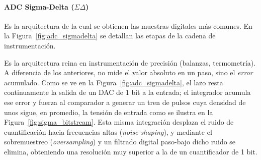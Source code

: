 \paragraph{ADC Sigma-Delta ($\Sigma\Delta$)}
Es la arquitectura de la cual se obtienen las muestras digitales más comunes. En la Figura~\ref{fig:adc_sigmadelta} se detallan las etapas de la cadena de instrumentación.
\begin{marginfigure}
    \centering
    \shorthandoff{>}
    \caption[Modulador Sigma-Delta.]{Modulador Sigma-Delta. El integrador acumula el error entre la entrada y la estimación, forzando al comparador a generar un tren de pulsos cuya densidad de unos es proporcional a $V_{in}$.}\label{fig:adc_sigmadelta}
\end{marginfigure}

Es la arquitectura reina en instrumentación de precisión (balanzas, termometría). A diferencia de los anteriores, no mide el valor absoluto en un paso, sino el \textit{error} acumulado. Como se ve en la Figura~\ref{fig:adc_sigmadelta}, el lazo resta continuamente la salida de un DAC de 1 bit a la entrada; el integrador acumula ese error y fuerza al comparador a generar un tren de pulsos cuya densidad de unos sigue, en promedio, la tensión de entrada como se ilustra en la Figura~\ref{fig:sigma_bitstream}. Esta misma integración desplaza el ruido de cuantificación hacia frecuencias altas (\textit{noise shaping}), y mediante el sobremuestreo (\textit{oversampling}) y un filtrado digital paso-bajo dicho ruido se elimina, obteniendo una resolución muy superior a la de un cuantificador de 1 bit.

